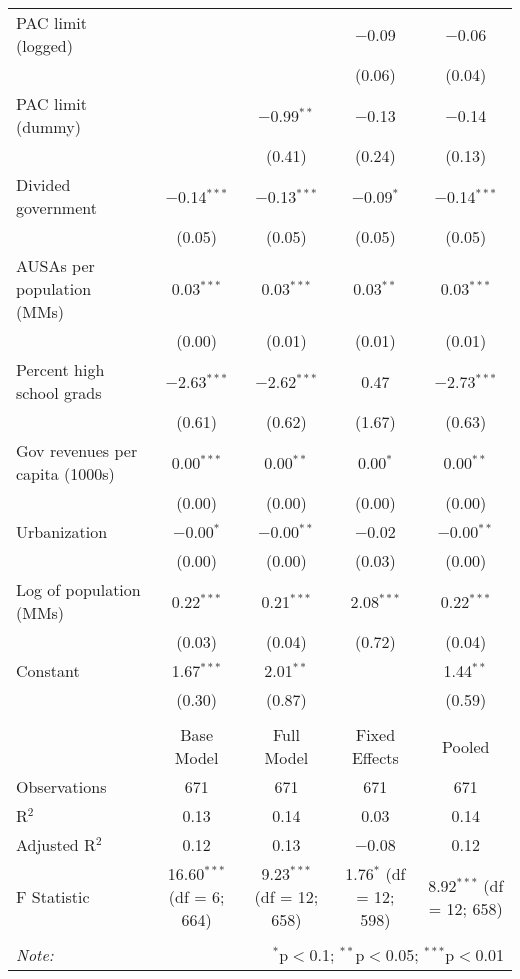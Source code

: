 \documentclass{jopsubmission}
\begin{document}
\begin{table}[!htbp]
{\begin{tabular}{@{\extracolsep{-15pt}}lcccc}
  PAC limit (logged) &  &  & $-$0.09 & $-$0.06 \\ 
  &  &  & (0.06) & (0.04) \\ 
  PAC limit (dummy) &  & $-$0.99$^{**}$ & $-$0.13 & $-$0.14 \\ 
  &  & (0.41) & (0.24) & (0.13) \\ 
  Divided government & $-$0.14$^{***}$ & $-$0.13$^{***}$ & $-$0.09$^{*}$ & $-$0.14$^{***}$ \\ 
  & (0.05) & (0.05) & (0.05) & (0.05) \\ 
  AUSAs per population (MMs) & 0.03$^{***}$ & 0.03$^{***}$ & 0.03$^{**}$ & 0.03$^{***}$ \\ 
  & (0.00) & (0.01) & (0.01) & (0.01) \\ 
  Percent high school grads & $-$2.63$^{***}$ & $-$2.62$^{***}$ & 0.47 & $-$2.73$^{***}$ \\ 
  & (0.61) & (0.62) & (1.67) & (0.63) \\ 
  Gov revenues per capita (1000s) & 0.00$^{***}$ & 0.00$^{**}$ & 0.00$^{*}$ & 0.00$^{**}$ \\ 
  & (0.00) & (0.00) & (0.00) & (0.00) \\ 
  Urbanization & $-$0.00$^{*}$ & $-$0.00$^{**}$ & $-$0.02 & $-$0.00$^{**}$ \\ 
  & (0.00) & (0.00) & (0.03) & (0.00) \\ 
  Log of population (MMs) & 0.22$^{***}$ & 0.21$^{***}$ & 2.08$^{***}$ & 0.22$^{***}$ \\ 
  & (0.03) & (0.04) & (0.72) & (0.04) \\ 
  Constant & 1.67$^{***}$ & 2.01$^{**}$ &  & 1.44$^{**}$ \\ 
  & (0.30) & (0.87) &  & (0.59) \\ 
 \hline \\[-1.8ex] 
  & Base Model & Full Model & Fixed Effects & Pooled \\ 
Observations & 671 & 671 & 671 & 671 \\ 
R$^{2}$ & 0.13 & 0.14 & 0.03 & 0.14 \\ 
Adjusted R$^{2}$ & 0.12 & 0.13 & $-$0.08 & 0.12 \\ 
F Statistic & 16.60$^{***}$ (df = 6; 664) & 9.23$^{***}$ (df = 12; 658) & 1.76$^{*}$ (df = 12; 598) & 8.92$^{***}$ (df = 12; 658) \\ 
\hline 
\hline \\[-1.8ex] 
\textit{Note:}  & \multicolumn{4}{r}{$^{*}$p$<$0.1; $^{**}$p$<$0.05; $^{***}$p$<$0.01} \\ 
\end{tabular} 
}
\end{table}
\end{document}
